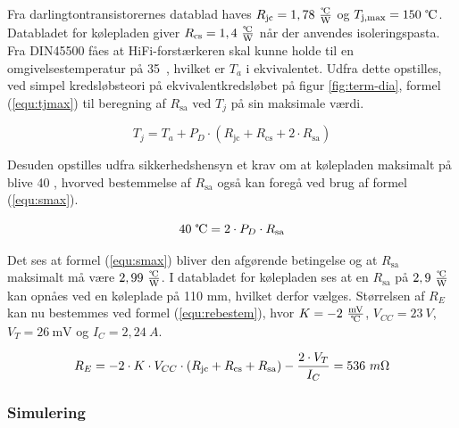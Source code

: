 Fra darlingtontransistorernes datablad haves $R_{\mathrm{jc}} = 1,78~\tfrac{\celsius}{\mathrm{W}}$ og $T_{\mathrm{j,max}} = 150~\celsius$. Databladet for kølepladen giver $R_{\mathrm{cs}} = 1,4~\tfrac{\celsius}{\mathrm{W}}$ når der anvendes isoleringspasta. Fra DIN45500  fåes at HiFi-forstærkeren skal kunne holde til en omgivelsestemperatur på 35~\celsius, hvilket er $T_a$ i ekvivalentet. Udfra dette opstilles, ved simpel kredsløbsteori på ekvivalentkredsløbet på figur \ref{fig:term-dia}, formel (\ref{equ:tjmax}) til beregning af $R_{\mathrm{sa}}$ ved $T_j$  på sin maksimale værdi. 

\begin{equation}
\label{equ:tjmax}
T_j = T_a + P_D \cdot (R_{\mathrm{jc}} + R_{\mathrm{cs}} + 2 \cdot R_{\mathrm{sa}})
\end{equation}

Desuden opstilles udfra sikkerhedshensyn et krav om at kølepladen maksimalt på blive 40 \celsius, hvorved bestemmelse af $R_{\mathrm{sa}}$ også kan foregå ved brug af formel (\ref{equ:smax}). 

\begin{equation}
\label{equ:smax}
40~\celsius = 2 \cdot P_D \cdot R_{\mathrm{sa}}
\end{equation}

Det ses at formel (\ref{equ:smax}) bliver den afgørende betingelse og at $R_{\mathrm{sa}}$ maksimalt må være $2,99~\tfrac{\celsius}{\mathrm{W}}$. I databladet for kølepladen ses at en $R_{\mathrm{sa}}$ på $2,9~\tfrac{\celsius}{\mathrm{W}}$ kan opnåes ved en køleplade på 110 mm, hvilket derfor vælges. Størrelsen af $R_E$ kan nu bestemmes ved formel (\ref{equ:rebestem}), hvor $K = - 2~\tfrac{\mathrm{mV}}{\celsius}$, $V_{CC} = 23~V$, $V_T = 26~\mathrm{mV}$ og $I_C = 2,24~A$.

\begin{equation}
\label{equ:rebestem}
R_E = - 2 \cdot K \cdot V_{CC} \cdot (R_{\mathrm{jc}} + R_{\mathrm{cs}} + R_{\mathrm{sa}}) - \frac{2 \cdot V_T}{I_C} = 536~m\ohm
\end{equation}

\subsubsection*{Simulering}

